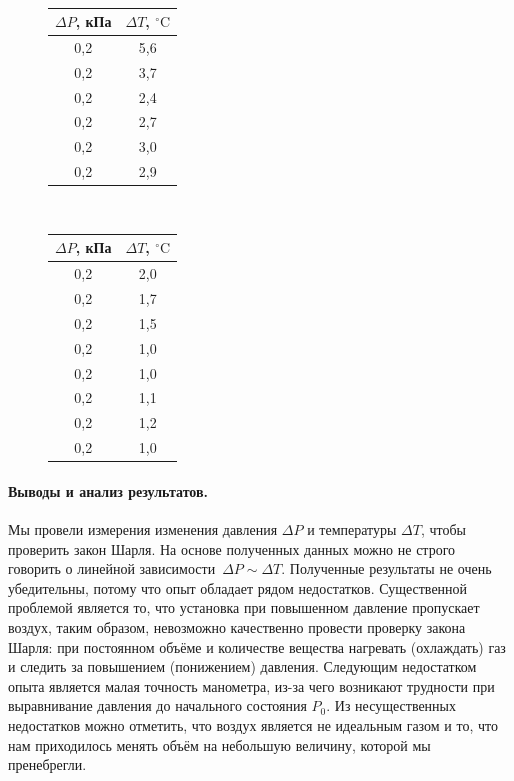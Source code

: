 \documentclass{article}
\begin{document}
\begin{figure}[htb]
\begin{minipage}{0.5\linewidth}
	\\
	\begin{tabular}{c|c}
	$\Delta P$, кПа&$\Delta T$, $^\circ\mbox{C}$\\
	\hline
	0,2&5,6 \\
	0,2&3,7  \\
	0,2&2,4 \\
	0,2&2,7 \\
	0,2&3,0 \\
	0,2&2,9 \\
\end{tabular}
\end{minipage}
\hfill
\begin{minipage}{0.5\linewidth}
	\\
\begin{tabular}{c|c}
	$\Delta P$, кПа&$\Delta T$, $^\circ\mbox{C}$\\
	\hline
	0,2&2,0 \\
	0,2&1,7  \\
	0,2&1,5  \\
	0,2&1,0  \\
	0,2&1,0 \\
	0,2&1,1 \\
	0,2& 1,2 \\
	0,2& 1,0 \\
\end{tabular}
\end{minipage}
\end{figure}
\paragraph{Выводы и анализ результатов.}
Мы провели измерения изменения давления $\Delta P$ и температуры $\Delta T$, чтобы проверить закон Шарля. На основе полученных данных можно не строго говорить о линейной зависимости~$\Delta P \sim \Delta T$. Полученные результаты не очень убедительны, потому что опыт обладает рядом недостатков. Существенной проблемой является то, что установка при повышенном давление пропускает воздух, таким образом, невозможно качественно провести проверку закона Шарля: при постоянном объёме и количестве вещества нагревать (охлаждать) газ и следить за повышением (понижением) давления. Следующим недостатком опыта является малая точность манометра, из-за чего возникают трудности при выравнивание давления до начального состояния $P_0$. Из несущественных недостатков можно отметить, что воздух является не идеальным газом и то, что нам приходилось менять объём на небольшую величину, которой мы пренебрегли.
\end{document}
